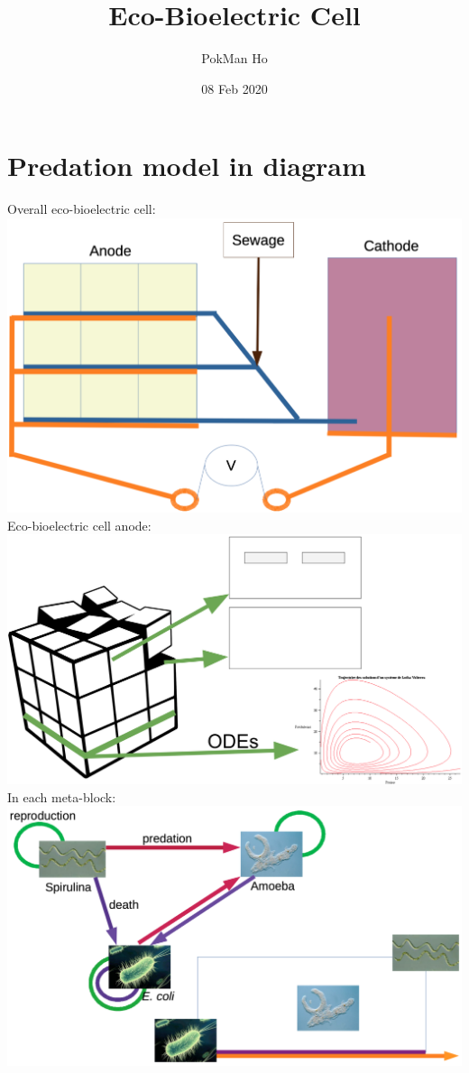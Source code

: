 \documentclass[a4paper,11pt]{article}
\title{Eco-Bioelectric Cell}
\author{PokMan Ho}
\date{08 Feb 2020}
\begin{document}
    \maketitle
    \tableofcontents

    \section{Predation model in diagram}
    Overall eco-bioelectric cell:\\
    \includegraphics[width=\linewidth]{sandbox/graph/battery.png}
    Eco-bioelectric cell anode:\\
    \includegraphics[width=\linewidth]{sandbox/graph/modelOverview.png}
    In each meta-block:\\
    \includegraphics[width=\linewidth]{sandbox/graph/model.png}
    
\end{document}
